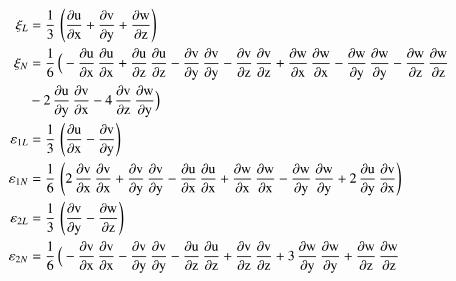 \begin{subequations}
	\begin{align}
	\mathrm \xi_{L} & = \frac{1}{3} \, \left(\mathrm{\frac{\partial u}{\partial x}} + \mathrm{\frac{\partial v}{\partial y}} + \mathrm{\frac{\partial w}{\partial z}}\right)\\
	\mathrm \xi_{N} & = \frac{1}{6} \, \Big(-\mathrm{\frac{\partial u}{\partial x}}\, \mathrm{\frac{\partial u}{\partial x}} + \mathrm{\frac{\partial u}{\partial z}}\, \mathrm{\frac{\partial u}{\partial z}}  - \mathrm{\frac{ \partial v}{\partial y}}\, \mathrm{\frac{ \partial v}{\partial y}} - \mathrm{\frac{\partial v}{\partial z}}\, \mathrm{\frac{\partial v}{\partial z}} + \mathrm{\frac{\partial w}{\partial x}}\, \mathrm{\frac{\partial w}{\partial x}} - \mathrm{\frac{\partial w}{\partial y}}\, \mathrm{\frac{\partial w}{\partial y}} - \mathrm{\frac{\partial w}{\partial z}}\, \mathrm{\frac{\partial w}{\partial z}} 
    \notag \\
    \mbox{} &  - 2 \, \mathrm{\frac{\partial u}{\partial y}}\, \mathrm{\frac{\partial v}{\partial x}} - 4 \, \mathrm{\frac{\partial v}{\partial z}}\, \mathrm{\frac{\partial w}{\partial y}} \Big)\\
	\mathrm \varepsilon_{1L} & = \frac{1}{3} \, \left(\mathrm{\frac{\partial u}{\partial x}} - \mathrm{\frac{\partial v}{\partial y}}\right)\\
	\mathrm \varepsilon_{1N} & = \frac{1}{6} \, \left(2 \, \mathrm{\frac{\partial v}{\partial x}}\, \mathrm{\frac{\partial v}{\partial x}} + \mathrm{\frac{ \partial v}{\partial y}}\, \mathrm{\frac{ \partial v}{\partial y}} - \mathrm{\frac{\partial u}{\partial x}}\, \mathrm{\frac{\partial u}{\partial x}} +  \mathrm{\frac{\partial w}{\partial x}}\, \mathrm{\frac{\partial w}{\partial x}} -  \mathrm{\frac{\partial w}{\partial y}}\, \mathrm{\frac{\partial w}{\partial y}} + 2 \, \mathrm{\frac{\partial u}{\partial y}}\, \mathrm{\frac{\partial v}{\partial x}}\right)\\
	\mathrm \varepsilon_{2L} & = \frac{1}{3} \, \left(\mathrm{\frac{\partial v}{\partial y}} - \mathrm{\frac{\partial w}{\partial z}}\right)\\
	\mathrm \varepsilon_{2N} & = \frac{1}{6} \, \Big(- \mathrm{\frac{\partial v}{\partial x}}\, \mathrm{\frac{\partial v}{\partial x}} - \mathrm{\frac{ \partial v}{\partial y}}\, \mathrm{\frac{ \partial v}{\partial y}} - \mathrm{\frac{\partial u}{\partial z}}\, \mathrm{\frac{\partial u}{\partial z}} + \mathrm{\frac{\partial v}{\partial z}}\, \mathrm{\frac{\partial v}{\partial z}} + 3 \,  \mathrm{\frac{\partial w}{\partial y}}\, \mathrm{\frac{\partial w}{\partial y}} +  \mathrm{\frac{\partial w}{\partial z}}\, \mathrm{\frac{\partial w}{\partial z}}  \notag \\

\end{align}
\end{subequations}
